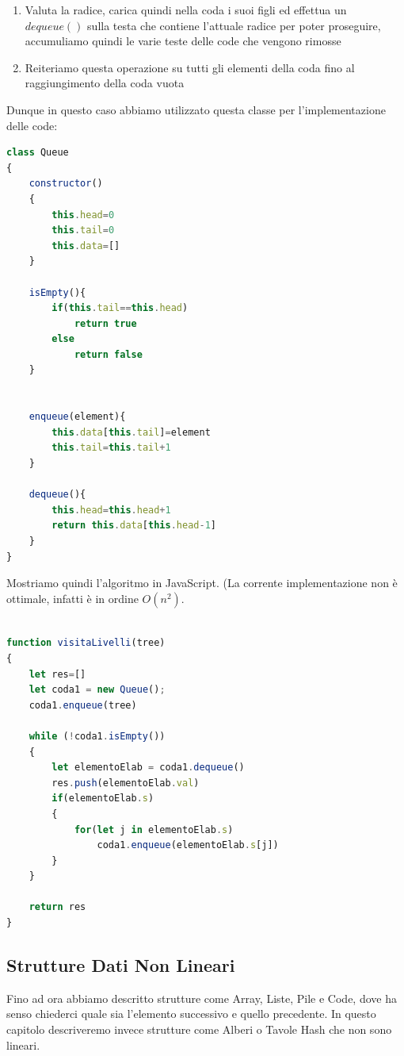 \documentclass{article}
\begin{document}
\begin{enumerate}
    \item Valuta la radice, carica quindi nella coda i suoi figli ed effettua un $dequeue()$ sulla testa che contiene l'attuale radice per poter proseguire, accumuliamo quindi le varie teste delle code che vengono rimosse
    \item Reiteriamo questa operazione su tutti gli elementi della coda fino al raggiungimento della coda vuota
\end{enumerate}

Dunque in questo caso abbiamo utilizzato questa classe per l'implementazione delle code:

\begin{lstlisting}[language=JavaScript]
    class Queue
{
    constructor()
    {
        this.head=0
        this.tail=0
        this.data=[]
    }

    isEmpty(){
        if(this.tail==this.head)
            return true
        else
            return false
    }


    enqueue(element){
        this.data[this.tail]=element
        this.tail=this.tail+1
    }

    dequeue(){
        this.head=this.head+1
        return this.data[this.head-1]
    }
}
\end{lstlisting}

Mostriamo quindi l'algoritmo in JavaScript. (La corrente implementazione non è ottimale, infatti è in ordine \(O(n^2)\).

\newpage

\begin{lstlisting}[language=JavaScript]

function visitaLivelli(tree)
{
    let res=[]
    let coda1 = new Queue();
    coda1.enqueue(tree)

    while (!coda1.isEmpty())
    {
        let elementoElab = coda1.dequeue()
        res.push(elementoElab.val)
        if(elementoElab.s)
        {
            for(let j in elementoElab.s)
                coda1.enqueue(elementoElab.s[j])
        }
    }

    return res
}

\end{lstlisting}

\subsection{Strutture Dati Non Lineari}

Fino ad ora abbiamo descritto strutture come Array, Liste, Pile e Code, dove ha senso chiederci quale sia l'elemento successivo e quello precedente. In questo capitolo descriveremo invece strutture come Alberi o Tavole Hash che non sono lineari.
\end{document}
